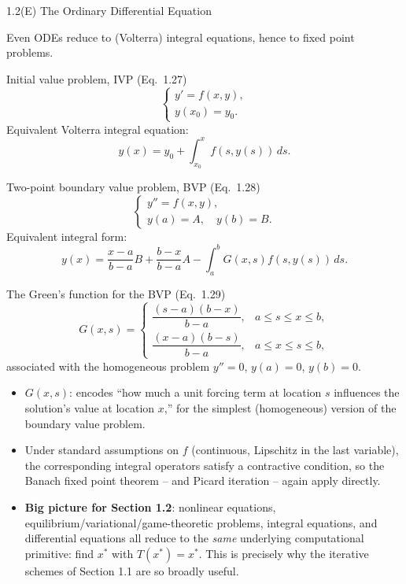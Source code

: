 \documentclass[aspectratio=169,10pt]{beamer}
\begin{document}
\begin{frame}[allowframebreaks]{1.2(E) The Ordinary Differential Equation}

Even ODEs reduce to (Volterra) integral equations, hence to fixed point
problems.

\begin{block}{Initial value problem, IVP (Eq.\ 1.27)}
\[
  \begin{cases} y' = f(x,y),\\ y(x_0)=y_0.\end{cases}
\]
Equivalent Volterra integral equation:
\[
  y(x) = y_0 + \int_{x_0}^x f(s,y(s))\,ds.
\]
\end{block}

\framebreak

\begin{block}{Two-point boundary value problem, BVP (Eq.\ 1.28)}
\[
  \begin{cases} y''=f(x,y),\\ y(a)=A,\quad y(b)=B.\end{cases}
\]
Equivalent integral form:
\[
  y(x) = \frac{x-a}{b-a}B + \frac{b-x}{b-a}A - \int_a^b G(x,s)f(s,y(s))\,ds.
\]
\end{block}

\framebreak

\begin{block}{The Green's function for the BVP (Eq.\ 1.29)}
\[
  G(x,s) = \begin{cases}
    \dfrac{(s-a)(b-x)}{b-a}, & a\le s\le x\le b,\\[6pt]
    \dfrac{(x-a)(b-s)}{b-a}, & a\le x\le s\le b,
  \end{cases}
\]
associated with the homogeneous problem $y''=0$, $y(a)=0$, $y(b)=0$.
\begin{itemize}
  \item $G(x,s)$: encodes ``how much a unit forcing term at location $s$
    influences the solution's value at location $x$,'' for the simplest
    (homogeneous) version of the boundary value problem.
\end{itemize}
\end{block}

\framebreak

\begin{itemize}
  \item Under standard assumptions on $f$ (continuous, Lipschitz in the
    last variable), the corresponding integral operators satisfy a
    contractive condition, so the Banach fixed point theorem -- and
    Picard iteration -- again apply directly.
  \item \textbf{Big picture for Section 1.2}: nonlinear equations,
    equilibrium/variational/game-theoretic problems, integral equations,
    and differential equations all reduce to the \emph{same} underlying
    computational primitive: find $x^*$ with $T(x^*)=x^*$. This is
    precisely why the iterative schemes of Section 1.1 are so broadly
    useful.
\end{itemize}

\end{frame}
\end{document}
